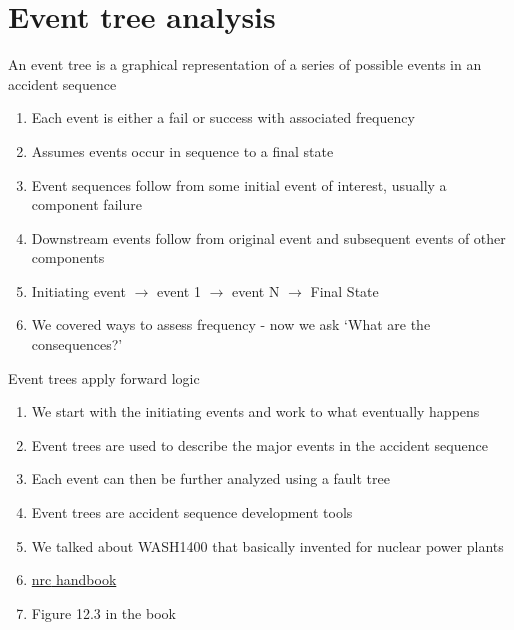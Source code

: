 \documentclass[aspectratio=1610,pdftex,dvipsnames,compress,xcolor={dvipsnames}]{beamer}
\newcommand{\acs}{\acrshort} %
\begin{document}
\section{Event tree analysis}


\addtocounter{framenumber}{-1}
\begin{frame}{An event tree is a graphical representation of a series of possible events in an accident sequence}
    \begin{enumerate}[series=outerlist,topsep=0pt,itemsep=17pt,leftmargin=*,label=(\arabic*)]
        \item[]Each event is either a fail or success with associated frequency
        \item[]Assumes events occur in sequence to a final state
        \item[]Event sequences follow from some initial event of interest, usually a component failure
        \item[]Downstream events follow from original event and subsequent events of other components
        \item[]Initiating event $\rightarrow$ event 1 $\rightarrow$ event N $\rightarrow$ Final State
        \item[]We covered ways to assess frequency - now we ask `What are the consequences?'
    \end{enumerate}
\end{frame}


\begin{frame}{Event trees apply forward logic}
    \begin{enumerate}[series=outerlist,topsep=0pt,itemsep=17pt,leftmargin=*,label=(\arabic*)]
        \item[]We start with the initiating events and work to what eventually happens
        \item[]Event trees are used to describe the major events in the accident sequence 
        \item[]Each event can then be further analyzed using a fault tree
        \item[]Event trees are accident sequence development tools
        \item[]We talked about WASH1400 that basically invented for nuclear power plants
        \item[]\href{http://www.nrc.gov/reading-rm/doc-collections/nuregs/staff/sr0492/}{\acs{nrc} handbook}
        \item[]Figure 12.3 in the book
    \end{enumerate}
\end{frame}
\end{document}
